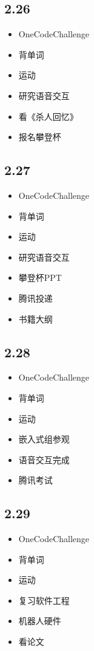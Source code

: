 \documentclass[UTF8]{ctexart}
\begin{document}
\subsection*{2.26}
\begin{itemize}
    \item OneCodeChallenge
    \item 背单词
    \item 运动
    \item 研究语音交互
    \item 看《杀人回忆》
    \item 报名攀登杯
\end{itemize}

\subsection*{2.27}
\begin{itemize}
    \item OneCodeChallenge
    \item 背单词
    \item 运动
    \item 研究语音交互
    \item 攀登杯PPT
    \item 腾讯投递
    \item 书籍大纲
\end{itemize}

\subsection*{2.28}
\begin{itemize}
    \item OneCodeChallenge
    \item 背单词
    \item 运动
    \item 嵌入式组参观
    \item 语音交互完成
    \item 腾讯考试
\end{itemize}

\subsection*{2.29}
\begin{itemize}
    \item OneCodeChallenge
    \item 背单词
    \item 运动
    \item 复习软件工程
    \item 机器人硬件
    \item 看论文
\end{itemize}
\end{document}

